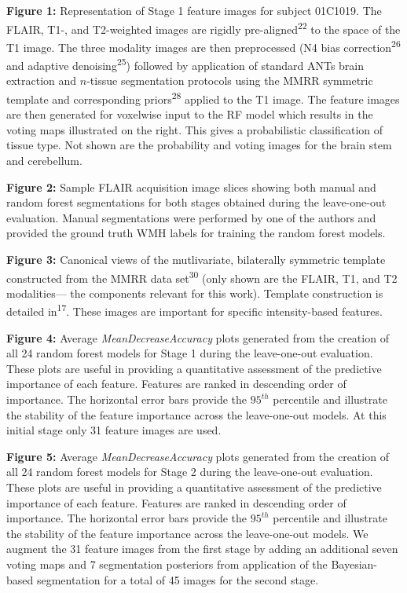 \documentclass[11pt,]{article}
\begin{document}
\textbf{Figure 1:} Representation of Stage 1 feature images for subject
01C1019. The FLAIR, T1-, and T2-weighted images are rigidly
pre-aligned\textsuperscript{22} to the space of the T1 image. The three
modality images are then preprocessed (N4 bias
correction\textsuperscript{26} and adaptive
denoising\textsuperscript{25}) followed by application of standard ANTs
brain extraction and \(n\)-tissue segmentation protocols using the MMRR
symmetric template and corresponding priors\textsuperscript{28} applied
to the T1 image. The feature images are then generated for voxelwise
input to the RF model which results in the voting maps illustrated on
the right. This gives a probabilistic classification of tissue type. Not
shown are the probability and voting images for the brain stem and
cerebellum.

\textbf{Figure 2:} Sample FLAIR acquisition image slices showing both
manual and random forest segmentations for both stages obtained during
the leave-one-out evaluation. Manual segmentations were performed by one
of the authors and provided the ground truth WMH labels for training the
random forest models.

\textbf{Figure 3:} Canonical views of the mutlivariate, bilaterally
symmetric template constructed from the MMRR data
set\textsuperscript{30} (only shown are the FLAIR, T1, and T2
modalities--- the components relevant for this work). Template
construction is detailed in\textsuperscript{17}. These images are
important for specific intensity-based features.

\textbf{Figure 4:} Average \emph{MeanDecreaseAccuracy} plots generated
from the creation of all 24 random forest models for Stage 1 during the
leave-one-out evaluation. These plots are useful in providing a
quantitative assessment of the predictive importance of each feature.
Features are ranked in descending order of importance. The horizontal
error bars provide the \(95^{th}\) percentile and illustrate the
stability of the feature importance across the leave-one-out models. At
this initial stage only 31 feature images are used.

\textbf{Figure 5:} Average \emph{MeanDecreaseAccuracy} plots generated
from the creation of all 24 random forest models for Stage 2 during the
leave-one-out evaluation. These plots are useful in providing a
quantitative assessment of the predictive importance of each feature.
Features are ranked in descending order of importance. The horizontal
error bars provide the \(95^{th}\) percentile and illustrate the
stability of the feature importance across the leave-one-out models. We
augment the 31 feature images from the first stage by adding an
additional seven voting maps and 7 segmentation posteriors from
application of the Bayesian-based segmentation for a total of 45 images
for the second stage.
\end{document}

